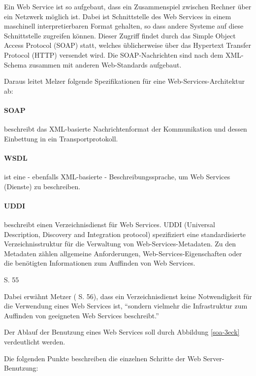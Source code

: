 Ein Web Service ist so aufgebaut, dass ein Zusammenspiel zwischen Rechner über ein Netzwerk möglich ist.
Dabei ist Schnittstelle des Web Services in einem maschinell interpretierbaren Format gehalten, so dass andere Systeme auf diese Schnittstelle zugreifen können.
Dieser Zugriff findet durch das Simple Object Access Protocol (\gls{SOAP}) statt, welches üblicherweise über das Hypertext Transfer Protocol (\gls{HTTP}) versendet wird.
Die \gls{SOAP}-Nachrichten sind nach dem \gls{XML}-Schema zusammen mit anderen Web-Standards aufgebaut.




Daraus leitet Melzer folgende Spezifikationen für eine Web-Services-Architektur ab:

\paragraph{SOAP}
beschreibt das \gls{XML}-basierte Nachrichtenformat der Kommunikation und dessen Einbettung in ein Transportprotokoll.
\paragraph{WSDL}
ist eine - ebenfalls \gls{XML}-basierte - Beschreibungssprache, um Web Services (Dienste) zu beschreiben.
\paragraph{UDDI}
beschreibt einen Verzeichnisdienst für Web Services. \gls{UDDI} (Universal Description, Discovery and Integration protocol) spezifiziert eine standardisierte Verzeichnisstruktur für die Verwaltung von Web-Services-Metadaten.
Zu den Metadaten zählen allgemeine Anforderungen, Web-Services-Eigenschaften oder die benötigten Informationen zum Auffinden von Web Services.
\begin{flushright}\cite{Melzer08} S. 55\end{flushright}

Dabei erwähnt Metzer (\cite{Melzer08} S. 56), dass ein Verzeichnisdienst keine Notwendigkeit für die Verwendung eines Web Services ist, "`sondern vielmehr die Infrastruktur zum Auffinden von geeigneten Web Services beschreibt."'


Der Ablauf der Benutzung eines Web Services soll durch Abbildung \ref{soa-3eck} verdeutlicht werden.

Die folgenden Punkte beschreiben die einzelnen Schritte der Web Server-Benutzung:

